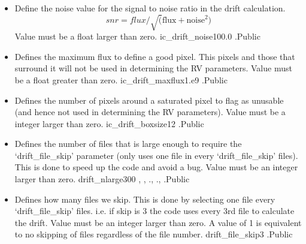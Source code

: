 \begin{itemize}


\item {}
{Define the noise value for the signal to noise ratio in the drift calculation.
\begin{equation}
snr = flux/\sqrt(\text{flux} + \text{noise}^2)
\end{equation}
Value must be a float larger than zero.
}
{ic\_drift\_noise}{100.0}
{\calDRIFTRAW}{\constantsfile}{\calDRIFTRAW.\progMAIN}{Public}


\item {}
{Defines the maximum flux to define a good pixel. This pixels and those that surround it will not be used in determining the RV parameters. Value must be a float greater than zero.}
{ic\_drift\_maxflux}{1.e9}
{\calDRIFTRAW}{\constantsfile}{\calDRIFTRAW.\progMAIN}{Public}


\item {}
{Defines the number of pixels around a saturated pixel to flag as unusable (and hence not used in determining the RV parameters). Value must be a integer larger than zero.}
{ic\_drift\_boxsize}{12}
{\calDRIFTRAW}{\constantsfile}{\calDRIFTRAW.\progMAIN}{Public}


\item {}
{Defines the number of files that is large enough to require the `drift\_file\_skip' parameter (only uses one file in every `drift\_file\_skip' files). This is done to speed up the code and avoid a bug. Value must be an integer larger than zero.}
{drift\_nlarge}{300}
{\calDRIFTRAW, \calDRIFTE, \calDRIFTPEAK}{\constantsfile}{\calDRIFTRAW.\progMAIN, \calDRIFTE.\progMAIN, \calDRIFTPEAK.\progMAIN}{Public}


\item {}
{Defines how many files we skip. This is done by selecting one file every `drift\_file\_skip' files. i.e. if skip is 3 the code uses every 3rd file to calculate the drift. Value must be an integer larger than zero. A value of 1 is equivalent to no skipping of files regardless of the file number.}
{drift\_file\_skip}{3}
{\calDRIFTRAW}{\constantsfile}{\calDRIFTRAW.\progMAIN}{Public}



\end{itemize}
